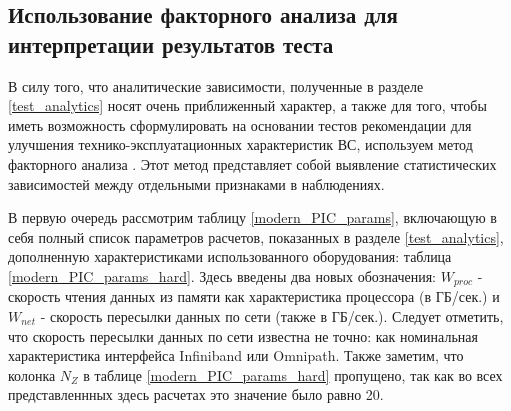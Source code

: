         \subsection{Использование факторного анализа для интерпретации результатов теста}
        
        В силу того, что аналитические зависимости, полученные в разделе \ref{test_analytics} носят очень приближенный характер, а также для того, чтобы иметь возможность сформулировать на основании тестов рекомендации для улучшения технико-эксплуатационных характеристик ВС, используем метод факторного анализа \cite{factanal}. Этот метод представляет собой выявление статистических зависимостей между отдельными признаками в наблюдениях. 
        
        В первую очередь рассмотрим таблицу \ref{modern_PIC_params}, включающую в себя полный список параметров расчетов, показанных в 
        разделе \ref{test_analytics}, дополненную характеристиками использованного оборудования: таблица \ref{modern_PIC_params_hard}. Здесь введены два новых обозначения: $W_{proc}$ - скорость чтения данных из памяти как характеристика процессора (в ГБ/сек.) и $W_{net}$ - скорость пересылки данных по сети 
        (также в ГБ/сек.). Следует отметить, что скорость пересылки данных по сети известна не точно: как номинальная характеристика интерфейса Infiniband или Omnipath. Также заметим, что колонка $N_Z$ в таблице \ref{modern_PIC_params_hard} пропущено, так как во всех представленнных здесь расчетах это значение было равно 20.
        
